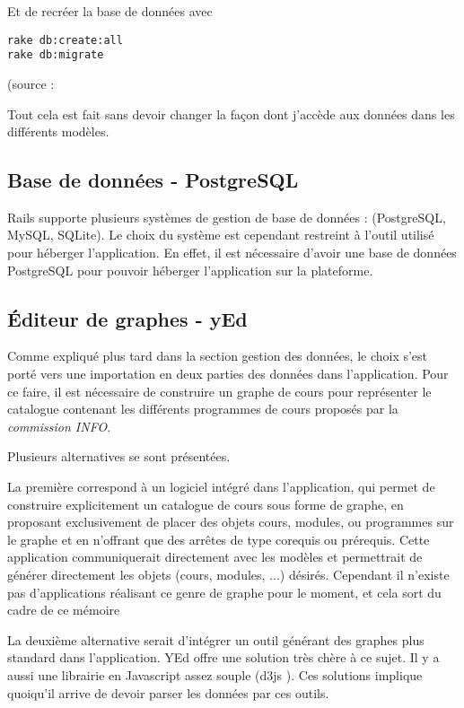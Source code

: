 Et de recréer la base de données avec
\begin{lstlisting}
rake db:create:all
rake db:migrate
\end{lstlisting}

(source : \cite{rails_cast_migration_to_postgresql}

Tout cela est fait sans devoir changer la façon dont j'accède aux données dans les différents modèles.  

\subsection{Base de données - PostgreSQL}

Rails supporte plusieurs systèmes de gestion de base de données : (PostgreSQL, MySQL, SQLite). Le choix du système est cependant restreint à l'outil utilisé pour héberger l'application. En effet, il est nécessaire d'avoir une base de données PostgreSQL pour pouvoir héberger l'application sur la plateforme. 

\subsection{Éditeur de graphes - yEd}

Comme expliqué plus tard dans la section gestion des données, le choix s'est porté vers une importation en deux parties des données dans l'application. Pour ce faire, il est nécessaire de construire un graphe de cours pour représenter le catalogue contenant les différents programmes de cours proposés par la \textit{commission INFO}.

Plusieurs alternatives se sont présentées.

La première correspond à un logiciel intégré dans l'application, qui permet de construire explicitement un catalogue de cours sous forme de graphe, en proposant exclusivement de placer des objets cours, modules, ou programmes sur le graphe et en n'offrant que des arrêtes de type corequis ou prérequis. Cette application communiquerait directement avec les modèles et permettrait de générer directement les objets (cours, modules, ...) désirés. Cependant il n'existe pas d'applications réalisant ce genre de graphe pour le moment, et cela sort du cadre de ce mémoire

La deuxième alternative serait d'intégrer un outil générant des graphes plus standard dans l'application. YEd offre une solution très chère à ce sujet. Il y a aussi une librairie en Javascript assez souple (d3js ). Ces solutions implique quoiqu'il arrive de devoir parser les données par ces outils.


